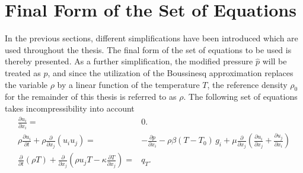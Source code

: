 \section{Final Form of the Set of Equations}

In the previous sections, different simplifications have been introduced which are used throughout the thesis. The final form of the set of equations to be used is thereby presented. As a further simplification, the modified pressure \(\hat{p}\) will be treated as \(p\), and since the utilization of the Boussinesq approximation replaces the variable \(\rho\) by a linear function of the temperature \(T\), the reference density \(\rho_0\) for the remainder of this thesis is referred to as \(\rho\). The following set of equations takes incompressibility into account
\begin{subequations}
\label{eq:completeset}
\begin{align}
\label{eq:contidiff}
\frac{\partial u_i}{\partial x_i} =& 0. \\[1em]
\label{eq:momentumdiff}
\rho \frac{\partial u_i}{\partial t} 
+ \rho \frac{\partial}{\partial x_j} \left( u_i  u_j \right) 
=& - \frac{\partial p}{\partial x_i} 
- \rho \beta \left( T - T_0 \right)\, g_i
+  \mu \frac{\partial}{\partial x_j} \left( \frac{\partial u_i}{\partial x_j} 
+ \frac{\partial u_j}{\partial x_i} \right) \\[1em]
\label{eq:temperaturediff}
\frac{\partial}{\partial t}\left(\rho T \right) + \frac{\partial}{\partial x_j} \left( \rho u_j T - \kappa \frac{\partial T}{\partial x_j} \right) =& q_T.
\end{align}
\end{subequations}

